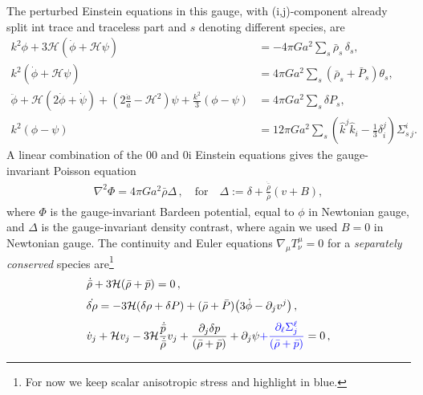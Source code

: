 The perturbed Einstein equations in this gauge, with (i,j)-component already split int trace and traceless part and $s$ denoting different species, are
\begin{align}
\label{eq:EE_00_poisson}
k^{2} \phi+3 \mathcal{H}(\dot{\phi}+\mathcal{H} \psi)&=-4 \pi G a^{2} \sum_{s} \bar{\rho}_{s} \,\delta_{s},
\\
%
k^{2}(\dot{\phi}+\mathcal{H} \psi)&=4 \pi G a^{2} \sum_{s}\left(\bar{\rho}_{s}+\bar{P}_{s}\right) \theta_{s},  \label{eq:EE_0j}
\\
%
\ddot{\phi}+\mathcal{H}(2 \dot{\phi}+\dot{\psi})+\left(2 \frac{\ddot{a}}{a}-\mathcal{H}^{2}\right) \psi+\frac{k^{2}}{3}(\phi-\psi)&=4 \pi G a^{2} \sum_{s} \delta P_{s}, \label{eq:EE_ij_diagonal}
\\
%
k^{2}(\phi-\psi)&=12 \pi G a^{2} \sum_{s}\left(\hat{k}^{j} \hat{k}_{i}-\frac{1}{3}\delta_{i}^{j}\right) \Sigma_{s\,j}^{i}. \label{eq:EE_ij_off_diagonal}
\end{align}
A linear combination of the 00 and 0i Einstein equations gives the gauge-invariant Poisson equation
\begin{align}\label{eq:poisson_gauge_invariant}
    \nabla^2\Phi= 4\pi G a^2 \bar{\rho}\Delta\, ,\quad  \text{for}\quad \Delta:=\delta +\frac{\dot{\bar{\rho}}}{\bar{\rho}}(v+B),
\end{align}
where $\Phi$ is the gauge-invariant Bardeen potential, equal to $\phi$ in Newtonian gauge, and $\Delta$ is the gauge-invariant density contrast, where again we used $B=0$ in Newtonian gauge. 
% 
The continuity and Euler equations $\nabla_\mu T^\mu_\nu=0$ for a \emph{separately conserved} species are\footnote{For now we keep {\color{blue}scalar anisotropic stress} and highlight in blue.}
{\small\begin{subequations}\label{eq:continuity_euler_bkg_perturbed}\begin{align}
    &\dot{\bar{\rho}} +3\mathcal{H}(\bar{\rho}+\bar{p})=0\,, \label{eq:background_continuity}\\[3pt]
    &\dot{\delta\rho}= -3\mathcal{H}(\delta\rho+\delta P) + (\bar{\rho}+\bar{P})\big(3\dot{\phi}-\partial_j v^j \big)\,,\label{eq:perturbed_continuity_drho}\\[3pt]
    &\dot{v}_j+ \mathcal{H}v_j-3\mathcal{H}\frac{\dot{\bar{p}}}{\dot{\bar{\rho}}}v_j+\frac{\partial_j\delta p}{(\bar{\rho}+\bar{p})}+\partial_j\psi{\color{blue}+\frac{\partial_\ell \Sigma^{\ell}_{j}}{(\bar{\rho}+\bar{p})}}=0\,,\label{eq:euler_vector_form}
\end{align}\end{subequations}}
